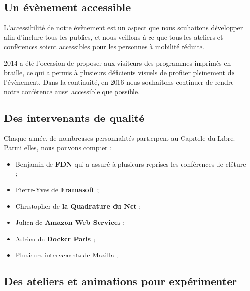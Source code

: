 \subsection{Un évènement accessible}

\begin{minipage}{0.4\textwidth}
\begin{center}
\end{center}
\end{minipage}
\begin{minipage}{0.6\textwidth}
L'accessibilité de notre évènement est un aspect que nous souhaitons
 développer afin d'inclure tous les publics, et nous veillons à ce que
 tous les ateliers et conférences soient accessibles pour les personnes
 à mobilité réduite.

2014 a été l'occasion de proposer aux visiteurs des programmes
 imprimés en braille, ce qui a permis à plusieurs déficients visuels
 de profiter pleinement de l'évènement. Dans la continuité, en 2016
 nous souhaitons continuer de rendre notre conférence aussi accessible
 que possible.
\end{minipage}

\subsection{Des intervenants de qualité}

Chaque année, de nombreuses personnalités participent au Capitole du Libre. Parmi elles, nous pouvons compter :

\begin{itemize}[label=$\bullet$]
\item Benjamin  de \textbf{FDN} qui a assuré à plusieurs reprises les conférences de clôture ;
\item Pierre-Yves  de \textbf{Framasoft} ;
\item Christopher  de \textbf{la Quadrature du Net} ;
\item Julien  de \textbf{Amazon Web Services} ;
\item Adrien  de \textbf{Docker Paris} ;
\item Plusieurs intervenants de Mozilla ;
\end{itemize} 

\subsection{Des ateliers et animations pour expérimenter}

